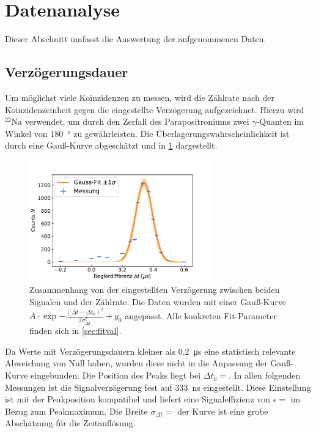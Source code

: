 \section{Datenanalyse}

	Dieser Abschnitt umfasst die Auswertung der aufgenommenen Daten.

\subsection{Verzögerungsdauer}
	
	Um möglichst viele Koinzidenzen zu messen, wird die Zählrate nach der Koinzidenzeinheit gegen die eingestellte Verzögerung aufgezeichnet.
	Hierzu wird $^{22}\text{Na}$ verwendet, um durch den Zerfall des Parapositroniums zwei $\gamma$-Quanten im Winkel von \SI{180}{\degree} zu gewährleisten.
	Die Überlagerungswahrscheinlichkeit ist durch eine Gauß-Kurve abgeschätzt und in \cref{fig:zeitdiff} dargestellt.
	\begin{figure}[ht]
		\centering
		\includegraphics[width=0.7\textwidth]{dat/zeitdifferenz.pdf}
		\caption{Zusammenhang von der eingestellten Verzögerung zwischen beiden Signalen und der Zählrate.
			Die Daten wurden mit einer Gauß-Kurve $A \cdot \exp{-\frac{(\Delta t - \Delta t_0)^2}{2 \sigma_{\Delta t}^2}} + y_0$ angepasst.
			Alle konkreten Fit-Parameter finden sich in \cref{sec:fitval}.}
		\label{fig:zeitdiff}
	\end{figure}
	Da Werte mit Verzögerungsdauern kleiner als \SI{0.2}{\micro\second} eine statistisch relevante Abweichung von Null haben, wurden diese nicht in die Anpassung der Gauß-Kurve eingebunden.
	Die Position des Peaks liegt bei $\Delta t_0 = $.
	In allen folgenden Messungen ist die Signalverzögerung fest auf \SI{333}{\nano\second} eingestellt.
	Diese Einstellung ist mit der Peakposition kompatibel und liefert eine Signaleffizienz von $\epsilon = $ im Bezug zum Peakmaximum.
	Die Breite $\sigma_{\Delta t} = $ der Kurve ist eine grobe Abschätzung für die Zeitauflösung.
	

